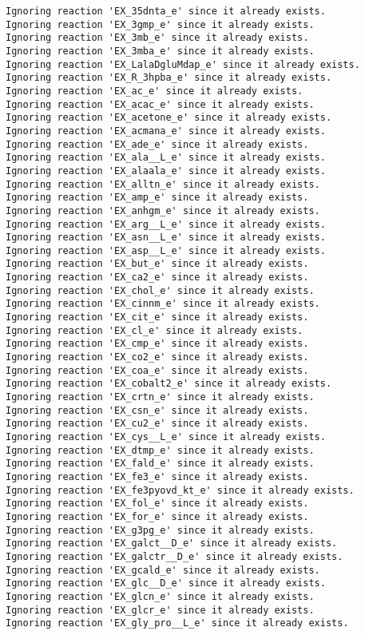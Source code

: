 \documentclass[
  letterpaper,
  DIV=11,
  numbers=noendperiod]{scrartcl}
\begin{document}
\begin{verbatim}
Ignoring reaction 'EX_35dnta_e' since it already exists.
Ignoring reaction 'EX_3gmp_e' since it already exists.
Ignoring reaction 'EX_3mb_e' since it already exists.
Ignoring reaction 'EX_3mba_e' since it already exists.
Ignoring reaction 'EX_LalaDgluMdap_e' since it already exists.
Ignoring reaction 'EX_R_3hpba_e' since it already exists.
Ignoring reaction 'EX_ac_e' since it already exists.
Ignoring reaction 'EX_acac_e' since it already exists.
Ignoring reaction 'EX_acetone_e' since it already exists.
Ignoring reaction 'EX_acmana_e' since it already exists.
Ignoring reaction 'EX_ade_e' since it already exists.
Ignoring reaction 'EX_ala__L_e' since it already exists.
Ignoring reaction 'EX_alaala_e' since it already exists.
Ignoring reaction 'EX_alltn_e' since it already exists.
Ignoring reaction 'EX_amp_e' since it already exists.
Ignoring reaction 'EX_anhgm_e' since it already exists.
Ignoring reaction 'EX_arg__L_e' since it already exists.
Ignoring reaction 'EX_asn__L_e' since it already exists.
Ignoring reaction 'EX_asp__L_e' since it already exists.
Ignoring reaction 'EX_but_e' since it already exists.
Ignoring reaction 'EX_ca2_e' since it already exists.
Ignoring reaction 'EX_chol_e' since it already exists.
Ignoring reaction 'EX_cinnm_e' since it already exists.
Ignoring reaction 'EX_cit_e' since it already exists.
Ignoring reaction 'EX_cl_e' since it already exists.
Ignoring reaction 'EX_cmp_e' since it already exists.
Ignoring reaction 'EX_co2_e' since it already exists.
Ignoring reaction 'EX_coa_e' since it already exists.
Ignoring reaction 'EX_cobalt2_e' since it already exists.
Ignoring reaction 'EX_crtn_e' since it already exists.
Ignoring reaction 'EX_csn_e' since it already exists.
Ignoring reaction 'EX_cu2_e' since it already exists.
Ignoring reaction 'EX_cys__L_e' since it already exists.
Ignoring reaction 'EX_dtmp_e' since it already exists.
Ignoring reaction 'EX_fald_e' since it already exists.
Ignoring reaction 'EX_fe3_e' since it already exists.
Ignoring reaction 'EX_fe3pyovd_kt_e' since it already exists.
Ignoring reaction 'EX_fol_e' since it already exists.
Ignoring reaction 'EX_for_e' since it already exists.
Ignoring reaction 'EX_g3pg_e' since it already exists.
Ignoring reaction 'EX_galct__D_e' since it already exists.
Ignoring reaction 'EX_galctr__D_e' since it already exists.
Ignoring reaction 'EX_gcald_e' since it already exists.
Ignoring reaction 'EX_glc__D_e' since it already exists.
Ignoring reaction 'EX_glcn_e' since it already exists.
Ignoring reaction 'EX_glcr_e' since it already exists.
Ignoring reaction 'EX_gly_pro__L_e' since it already exists.

\end{verbatim}
\end{document}
